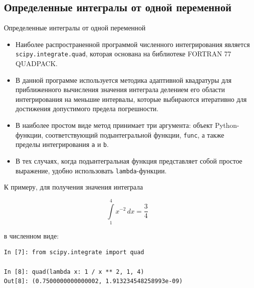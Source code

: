 \documentclass[aspectratio=169, mathserif]{beamer}	%
\begin{document}
\subsection{Определенные интегралы от одной переменной}
\begin{frame}[fragile]{Определенные интегралы от одной переменной}
\scriptsize
\begin{itemize}
	\item Наиболее распространенной программой численного интегрирования является \linebreak \texttt{scipy.integrate.quad}, которая основана на библиотеке FORTRAN 77 QUADPACK.
	\item В данной программе используется методика адаптивной квадратуры для приближенного вычисления значения интеграла делением его области интегрирования на меньшие интервалы, которые выбираются итеративно для достижения допустимого предела погрешности.
	\item В наиболее простом виде метод принимает  три аргумента: объект Python-функции, соответствующий подынтегральной функции, \texttt{func}, а также пределы интегрирования \texttt{a} и \texttt{b}.
	\item В тех случаях, когда подынтегральная функция представляет собой простое выражение, удобно использовать \textcolor{ipython_green}{\texttt{lambda}}-функции.
\end{itemize}
К примеру, для получения значения интеграла 

$$ \int\limits_{1}^{4} x^{-2} \, dx = \dfrac{3}{4} $$


\noindent в численном виде:

\begin{lstlisting}[language=iPython, numbers=none, frame=none, ]
In [7]: from scipy.integrate import quad

In [8]: quad(lambda x: 1 / x ** 2, 1, 4)
Out[8]: (0.7500000000000002, 1.913234548258993e-09)
\end{lstlisting}
\vfill
\end{frame}
\end{document}
